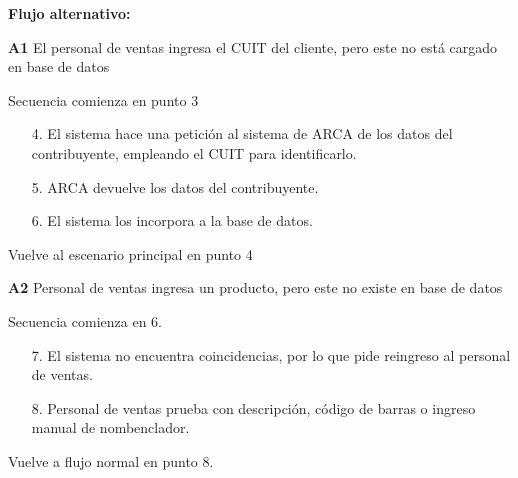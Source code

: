 \textbf{Flujo alternativo:}

\textbf{A1} El personal de ventas ingresa el CUIT del cliente, pero este no está cargado en base de datos

Secuencia comienza en punto 3

\begin{enumerate}
	\item[4.] El sistema hace una petición al sistema de ARCA de los datos del contribuyente, 
	empleando el CUIT para identificarlo.
	\item[5.] ARCA devuelve los datos del contribuyente.
	\item[6.] El sistema los incorpora a la base de datos.
\end{enumerate}

Vuelve al escenario principal en punto 4

\textbf{A2} Personal de ventas ingresa un producto, pero este no existe en base de datos

Secuencia comienza en 6.

\begin{enumerate}
	\item[7.] El sistema no encuentra coincidencias, por lo que pide reingreso al personal de ventas.
	\item[8.] Personal de ventas prueba con descripción, código de barras o ingreso manual de nombenclador.
\end{enumerate}

Vuelve a flujo normal en punto 8.
